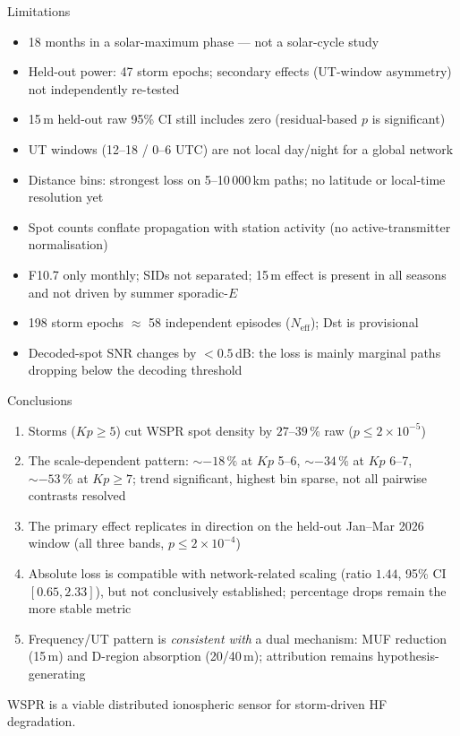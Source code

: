 \documentclass[aspectratio=169,10pt]{beamer}
\begin{document}
\begin{frame}{Limitations}
  \begin{itemize}
    \item 18 months in a solar-maximum phase --- not a solar-cycle study
    \item Held-out power: 47 storm epochs; secondary effects
      (UT-window asymmetry) not independently re-tested
    \item 15\,m held-out raw 95\% CI still includes zero
      (residual-based $p$ is significant)
    \item UT windows (12--18 / 0--6 UTC) are not local day/night
      for a global network
    \item Distance bins: strongest loss on 5--10\,000\,km paths;
      no latitude or local-time resolution yet
    \item Spot counts conflate propagation with station activity
      (no active-transmitter normalisation)
    \item F10.7 only monthly; SIDs not separated; 15\,m effect is present
      in all seasons and not driven by summer sporadic-$E$
    \item 198 storm epochs $\approx$ 58 independent episodes
      ($N_{\mathrm{eff}}$); Dst is provisional
    \item Decoded-spot SNR changes by $<0.5$\,dB: the loss is mainly
      marginal paths dropping below the decoding threshold
  \end{itemize}
\end{frame}

\begin{frame}{Conclusions}
  \begin{enumerate}
    \item Storms ($Kp\ge5$) cut WSPR spot density by $27$--$39\,\%$
      raw ($p\le2\times10^{-5}$)
    \item The scale-dependent pattern: $\sim-18\,\%$ at $Kp$ 5--6,
      $\sim-34\,\%$ at $Kp$ 6--7, $\sim-53\,\%$ at $Kp\ge7$;
      trend significant, highest bin sparse, not all pairwise
      contrasts resolved
    \item The primary effect \alert{replicates in direction} on the held-out
      Jan--Mar 2026 window (all three bands, $p\le2\times10^{-4}$)
    \item Absolute loss is \alert{compatible with network-related scaling}
      (ratio $1.44$, 95\% CI $[0.65, 2.33]$), but not conclusively
      established; percentage drops remain the more stable metric
    \item Frequency/UT pattern is \emph{consistent with} a dual mechanism:
      MUF reduction (15\,m) and D-region absorption (20/40\,m);
      attribution remains hypothesis-generating
  \end{enumerate}
  \vskip0.3cm
  \begin{center}
    WSPR is a viable \alert{distributed ionospheric sensor} for
    storm-driven HF degradation.
  \end{center}
\end{frame}
\end{document}
